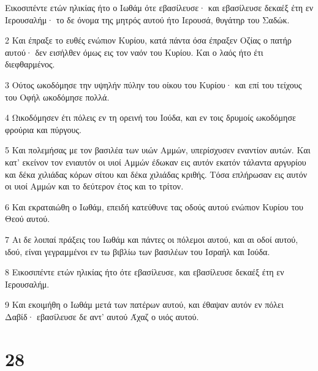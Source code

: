 \par Εικοσιπέντε ετών ηλικίας ήτο ο Ιωθάμ ότε εβασίλευσε· και εβασίλευσε δεκαέξ έτη εν Ιερουσαλήμ· το δε όνομα της μητρός αυτού ήτο Ιερουσά, θυγάτηρ του Σαδώκ.
\par 2 Και έπραξε το ευθές ενώπιον Κυρίου, κατά πάντα όσα έπραξεν Οζίας ο πατήρ αυτού· δεν εισήλθεν όμως εις τον ναόν του Κυρίου. Και ο λαός ήτο έτι διεφθαρμένος.
\par 3 Ούτος ωκοδόμησε την υψηλήν πύλην του οίκου του Κυρίου· και επί του τείχους του Οφήλ ωκοδόμησε πολλά.
\par 4 Ωικοδόμησεν έτι πόλεις εν τη ορεινή του Ιούδα, και εν τοις δρυμοίς ωκοδόμησε φρούρια και πύργους.
\par 5 Και πολεμήσας με τον βασιλέα των υιών Αμμών, υπερίσχυσεν εναντίον αυτών. Και κατ' εκείνον τον ενιαυτόν οι υιοί Αμμών έδωκαν εις αυτόν εκατόν τάλαντα αργυρίου και δέκα χιλιάδας κόρων σίτου και δέκα χιλιάδας κριθής. Τόσα επλήρωσαν εις αυτόν οι υιοί Αμμών και το δεύτερον έτος και το τρίτον.
\par 6 Και εκραταιώθη ο Ιωθάμ, επειδή κατεύθυνε τας οδούς αυτού ενώπιον Κυρίου του Θεού αυτού.
\par 7 Αι δε λοιπαί πράξεις του Ιωθάμ και πάντες οι πόλεμοι αυτού, και αι οδοί αυτού, ιδού, είναι γεγραμμένοι εν τω βιβλίω των βασιλέων του Ισραήλ και Ιούδα.
\par 8 Εικοσιπέντε ετών ηλικίας ήτο ότε εβασίλευσε, και εβασίλευσε δεκαέξ έτη εν Ιερουσαλήμ.
\par 9 Και εκοιμήθη ο Ιωθάμ μετά των πατέρων αυτού, και έθαψαν αυτόν εν πόλει Δαβίδ· εβασίλευσε δε αντ' αυτού Άχαζ ο υιός αυτού.

\chapter{28}

